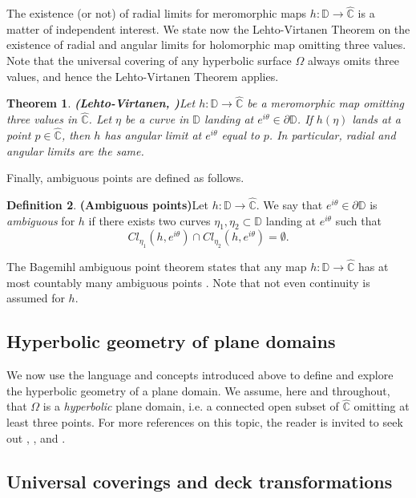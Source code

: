 \documentclass[11pt,a4paper,reqno]{amsart}
\theoremstyle{plain}
\newtheorem{thm}{Theorem}[section]
\theoremstyle{definition}
\newtheorem{defi}[thm]{Definition}
\theoremstyle{plain}
\def\Chat{\widehat{\mathbb{C}}}
\begin{document}
The existence (or not) of radial limits for meromorphic maps $ h\colon \mathbb{D}\to \Chat$ is a matter of independent interest.  We state now the Lehto-Virtanen Theorem on the existence of radial and angular limits for holomorphic map omitting three values. Note that the universal covering of any hyperbolic surface $ \Omega $ always omits three values, and hence the Lehto-Virtanen Theorem applies.
\begin{thm}{\bf (Lehto-Virtanen, {\normalfont \cite[Sec. 4.1]{Pom92}})}\label{thm-lehto-virtanen}
	Let $ h\colon\mathbb{D}\to\widehat{\mathbb{C}} $ be a meromorphic map omitting three values in $ \widehat{\mathbb{C}}  $. Let $ \eta $ be a curve in $ \mathbb{D} $ landing at $ e^{i\theta} \in\partial \mathbb{D} $. If $ h(\eta) $ lands at a point $ p\in\widehat{\mathbb{C}} $, then $ h $ has angular limit at $ e^{i\theta} $  equal to $ p $. In particular, radial and angular limits are the same.
\end{thm}


Finally, ambiguous points are defined as follows.
\begin{defi}{\bf (Ambiguous points)}\label{def-ambiguous}
	Let $ h \colon \mathbb{D} \to \widehat{\mathbb{C}} $. We say that $ e^{i\theta}\in\partial\mathbb{D} $ is {\em ambiguous} for $ h $ if there exists two curves $ \eta_1,\eta_2\subset\mathbb{D} $ landing at $ e^{i\theta} $ such that 
	\[ Cl_{\eta_1}(h, e^{i\theta})\cap  Cl_{\eta_2}(h, e^{i\theta})=\emptyset.\]
\end{defi}

The Bagemihl ambiguous point theorem states that any map $ h \colon \mathbb{D} \to \widehat{\mathbb{C}} $ has at most countably many ambiguous points \cite[Cor. 2.20]{Pom92}. Note that not even continuity is assumed for $ h $.

\subsection{Hyperbolic geometry of plane domains}\label{subs:hypgeo}
We now use the language and concepts introduced above to define and explore the hyperbolic geometry of a plane domain. We assume, here and throughout, that $\Omega$ is a \textit{hyperbolic} plane domain, i.e. a connected open subset of $\Chat$ omitting at least three points. For more references on this topic, the reader is invited to seek out \cite[Chap. 1]{Aba23}, \cite[Chap. 3]{Hub06}, and \cite[Chap. 7]{KeenLakic}.

\subsection*{Universal coverings and deck transformations}
\end{document}
